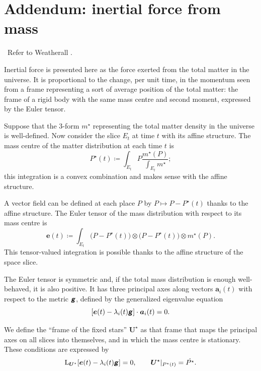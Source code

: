 \documentclass[\ifafour a4paper,12pt,\else a5paper,10pt,\fi%
onecolumn,oneside,article,%
british%
]{memoir}
\theoremstyle{remark}
\theoremstyle{innote}
\newcommand*{\mathte}[1]{\textbf{\textit{\textsf{#1}}}}
\newcommand*{\citep}{\parencites}
\newcommand*{\citey}{\parencites*}
\newcommand*{\defd}{\coloneqq}
\renewcommand*{\|}{\nonscript\,\vert\nonscript\;\mathopen{}}
\newcommand*{\sect}{\S}%
\newcommand*{\puzzle}{{\fontencoding{U}\fontfamily{fontawesometwo}\selectfont\symbol{225}}}
\newcommand{\mynote}[1]{ {\color{notecolour}\puzzle\ #1}}
\newcommand*{\Li}{\mathrm{L}}
\newcommand*{\ydd}{m}
\newcommand*{\yd}{\ydd}
\newcommand*{\yrfs}{\yd^{\mathord{\star}}}
\newcommand*{\yP}{P}
\newcommand*{\yPc}{\yP^{\mathord{\star}}}
\newcommand*{\yEu}{E}
\newcommand*{\yeu}{\bm{e}}
\newcommand*{\yva}{\bm{a}}
\newcommand*{\yla}{\lambda}
\newcommand*{\yFF}{U}
\newcommand*{\yF}{\bm{\yFF}}
\newcommand*{\yFi}{\yF^{\mathord{\star}}}
\newcommand*{\ycfs}{\yFi}
\newcommand*{\ygg}{g}
\newcommand*{\yg}{\mathte{\ygg}}
\begin{document}
\appendix



\section{Addendum: inertial force from mass}
\label{sec:inertial_force}

\mynote{Refer to Weatherall \citey{weatherall2017}.}

Inertial force is presented here as the force exerted from the total matter
in the universe. It is proportional to the change, per unit time, in the
momentum seen from a frame representing a sort of average position of the
total matter: the frame of a rigid body with the same mass centre and
second moment, expressed by the Euler tensor.


Suppose that the  3-form $\yrfs$ representing the total matter density in the
universe is well-defined. Now consider the slice $\yEu_t$ at time $t$ with its
affine structure. The mass centre of the matter distribution at each time $t$ is
\begin{equation}
  \label{eq:mass_centre}
  \yPc(t) \defd \int_{\yEu_t} \yP \frac{\yrfs(\yP)}{\int_{\yEu_t}\yrfs};
\end{equation}
this integration is a convex combination and makes sense with the affine
structure. %

A vector field can be defined at each place $\yP$ by
$\yP\mapsto \yP-\yPc(t)$ thanks to the affine structure. The Euler tensor
\citep[\sect~I.10]{truesdell1977_r1991} of the mass distribution with
respect to its mass centre is
\begin{equation}
  \label{eq:euler_univ}
  \yeu(t) \defd \int_{\yEu_t}
  \bigl(\yP -\yPc(t)\bigr)\otimes \bigl(\yP-\yPc(t)\bigr)
  \otimes \yrfs(\yP).
\end{equation}
This tensor-valued integration is possible thanks to the affine structure
of the space slice.

The Euler tensor is symmetric and, if the total mass distribution is enough
well-behaved, it is also positive. It has three principal axes along
vectors $\yva_i(t)$ with respect to the metric $\yg$, defined by the
generalized eigenvalue equation
\begin{equation}
  \label{eq:principal_axes_euler}
  [\yeu(t) - \yla_i(t) \yg] \cdot \yva_i(t) = 0.
\end{equation}

We define the \enquote{frame of the fixed stars} $\yFi$ as that frame that maps
the principal axes on all slices into themselves, and in which the mass
centre is stationary. These conditions are expressed by
\begin{equation}
  \label{eq:defin_fixed-star_frame}
  \Li_{\yFi}[\yeu(t) - \yla_i(t) \yg]=0,\qquad
  \yFi\rvert_{\yPc(t)}=\Dot{\yPc}.
\end{equation}
\end{document}
